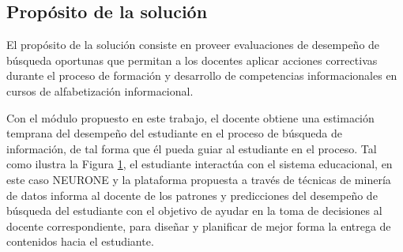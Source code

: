 \subsection{Propósito de la solución}
\label{subsec:proposito-solucion}
El propósito de la solución consiste en proveer evaluaciones de desempeño de búsqueda oportunas que permitan a los docentes aplicar acciones correctivas durante el proceso de formación y desarrollo de competencias informacionales en cursos de alfabetización informacional.

Con el módulo propuesto en este trabajo, el docente obtiene una estimación temprana del desempeño del estudiante en el proceso de búsqueda de información, de tal forma que él pueda guiar al estudiante en el proceso. Tal como ilustra la Figura \ref{fig:docente_estudiante}, el estudiante interactúa con el sistema educacional, en este caso NEURONE y la plataforma propuesta a través de técnicas de minería de datos informa al docente de los patrones y predicciones del desempeño de búsqueda del estudiante con el objetivo de ayudar en la toma de decisiones al docente correspondiente, para diseñar y planificar de mejor forma la entrega de contenidos hacia el estudiante.

\begin{figure}[H]
	\centering
	
	\label{fig:docente_estudiante}
\end{figure}
